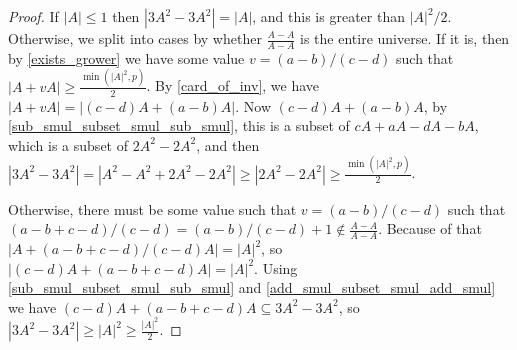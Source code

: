 \begin{proof}
    \leanok
    If $|A| \leq 1$ then $|3 A^2 - 3 A^2| = |A|$, and this is greater than $|A|^2 / 2$.
    Otherwise, we split into cases by whether $\frac{A - A}{A - A}$ is the entire universe.
    If it is, then by \ref{exists_grower} we have some value $v = (a-b)/(c-d)$ such that
    $|A + vA| \geq \frac{\min(|A|^2, p)}2$. By \ref{card_of_inv}, we have $|A + vA| = |(c-d) A + (a-b) A|$.
    Now $(c-d) A + (a-b) A$, by \ref{sub_smul_subset_smul_sub_smul}, this is a subset of 
    $c A + a A - d A - b A$, which is a subset of $2 A^2 - 2 A^2$, and then
    $|3A^2 - 3A^2| = |A^2 - A^2 + 2 A^2 - 2 A^2| \geq |2 A^2 - 2 A^2| \geq \frac{\min(|A|^2, p)}2$.

    Otherwise, there must be some value such that $v = (a-b)/(c-d)$ such that
    $(a-b+c-d)/(c-d) = (a-b)/(c-d)+1 \notin \frac{A - A}{A - A}$.
    Because of that $|A + (a-b+c-d)/(c-d) A| = |A|^2$, so
    $|(c-d) A + (a-b+c-d) A| = |A|^2$. 
    Using \ref{sub_smul_subset_smul_sub_smul} and \ref{add_smul_subset_smul_add_smul} we have
    $(c-d) A + (a-b+c-d) A \subseteq 3A^2 - 3A^2$, so $|3A^2 - 3A^2| \geq |A|^2 \geq \frac{|A|^2}2$.
\end{proof}